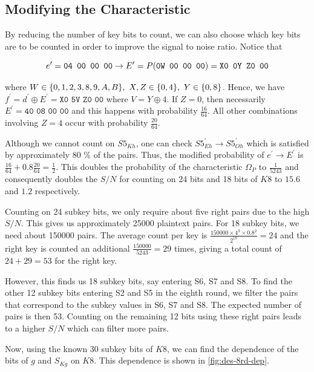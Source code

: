 \documentclass[twoside]{article}
\begin{document}
\subsection{Modifying the Characteristic}
By reducing the number of key bits to count, we can also choose which key bits
are to be counted in order to improve the signal to noise ratio. Notice that

\begin{equation}
    e^\prime = \texttt{04 00 00 00} \rightarrow E^\prime = P(\texttt{0W 00 00 00}) = \texttt{X0 0Y Z0 00}
    \label{eq:des-8-r5-rel}
\end{equation}

where \(W \in \{0,1,2,3,8,9,A,B\},\ X,Z \in \{0,4\},\ Y \in
\{0,8\}\). Hence, we have \(f^\prime = d^\prime \oplus E^\prime = \texttt{X0
5V Z0 00}\) where \(V = Y \oplus 4\). If \(Z = 0\), then necessarily \(E^\prime
= \texttt{40 08 00 00}\) and this happens with probability \(\frac{16}{64}\).
All other combinations involving \(Z = 4\) occur with probability
\(\frac{20}{64}\).

Although we cannot count on \(S5_{Kh}\), one can check \(S5^\prime_{Eh}
\rightarrow S5^\prime_{Oh}\) which is satisfied by approximately 80 \% of the
pairs. Thus, the modified probability of \(e^\prime \rightarrow E^\prime\) is
\(\frac{16}{64} + 0.8\frac{20}{64} = \frac{1}{2}\). This doubles the probability
of the characteristic \(\Omega_P\) to \(\frac{1}{5243}\) and consequently
doubles the \(S/N\) for counting on 24 bits and 18 bits of \(K8\) to \(15.6\)
and \(1.2\) respectively.

Counting on 24 subkey bits, we only require about five right pairs due to the
high \(S/N\). This gives us approximately 25000 plaintext pairs. For 18 subkey
bits, we need about 150000 pairs. The average count per key is \(\frac{150000
\times 4^3 \times 0.8^2}{2^18} = 24\) and the right key is counted an additional
\(\frac{150000}{5243} = 29\) times, giving a total count of \(24 + 29 = 53\) for
the right key.

However, this finds us 18 subkey bits, say entering S6, S7 and S8. To find the
other 12 subkey bits entering S2 and S5 in the eighth round, we filter the pairs
that correspond to the subkey values in S6, S7 and S8. The expected number of
pairs is then 53. Counting on the remaining 12 bits using these right pairs
leads to a higher \(S/N\) which can filter more pairs.

Now, using the known 30 subkey bits of \(K8\), we can find the dependence of the
bits of \(g\) and \(S_{Kg}\) on \(K8\). This dependence is shown in
\autoref{fig:des-8rd-dep}.
\end{document}
